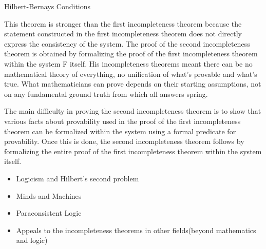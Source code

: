 \documentclass{article}
\begin{document}
Hilbert-Bernays Conditions



This theorem is stronger than the first incompleteness theorem because the statement constructed in the first incompleteness theorem does not directly express the consistency of the system. The proof of the second incompleteness theorem is obtained by formalizing the proof of the first incompleteness theorem within the system F itself.
His incompleteness theorems meant there can be no mathematical theory of everything, no unification of what’s provable and what’s true. What mathematicians can prove depends on their starting assumptions, not on any fundamental ground truth from which all answers spring.





The main difficulty in proving the second incompleteness theorem is to show that various facts about provability used in the proof of the first incompleteness theorem can be formalized within the system using a formal predicate for provability. Once this is done, the second incompleteness theorem follows by formalizing the entire proof of the first incompleteness theorem within the system itself.
\begin{itemize}

\item Logicism and Hilbert's second problem
\item  Minds and Machines
\item Paraconsistent Logic
\item Appeals to the incompleteness theorems in other fields(beyond mathematics and logic)

\end{itemize}


 
\end{document}
